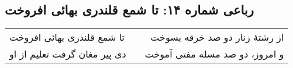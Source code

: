 \begin{center}
\section*{رباعی شماره ۱۴: تا شمع قلندری بهائی افروخت}
\label{sec:014}
\begin{longtable}{l p{0.5cm} r}
تا شمع قلندری بهائی افروخت
&&
از رشتهٔ زنار دو صد خرقه بسوخت
\\
دی پیر مغان گرفت تعلیم از او
&&
و امروز، دو صد مسله مفتی آموخت
\\
\end{longtable}
\end{center}
